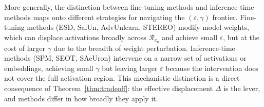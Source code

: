 \begin{remark}
\label{rem:finetuning}
More generally, the distinction between fine-tuning methods and inference-time methods maps onto different strategies for navigating the $(\varepsilon, \gamma)$ frontier. Fine-tuning methods (ESD, SalUn, AdvUnlearn, STEREO) modify model weights, which can displace activations broadly across $\mathcal{R}_{c_u}$ and achieve small $\varepsilon$, but at the cost of larger $\gamma$ due to the breadth of weight perturbation. Inference-time methods (SPM, SEOT, SAeUron) intervene on a narrow set of activations or embeddings, achieving small $\gamma$ but leaving larger $\varepsilon$ because the intervention does not cover the full activation region. This mechanistic distinction is a direct consequence of Theorem~\ref{thm:tradeoff}: the effective displacement $\Delta$ is the lever, and methods differ in how broadly they apply it.
\end{remark}





